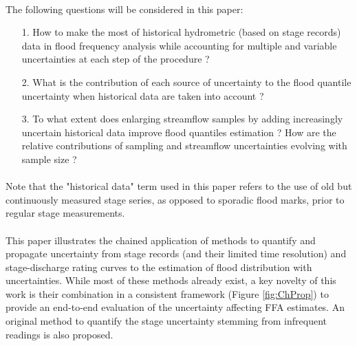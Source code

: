 \documentclass[11pt]{article}
\begin{document}
    \paragraph{}
    The following questions will be considered in this paper: 
    \begin{itemize}
        \item[1.] How to make the most of historical hydrometric (based on stage records) data in flood frequency analysis while accounting for multiple and variable uncertainties at each step of the procedure ? 
        
        \item[2.] What is the contribution of each source of uncertainty to the flood quantile uncertainty when historical data are taken into account ? 
        
        \item[3.] To what extent does enlarging streamflow samples by adding increasingly uncertain historical data improve flood quantiles estimation ? How are the relative contributions of sampling and streamflow uncertainties evolving with sample size ?
    \end{itemize}

    \paragraph{}
    Note that the "historical data" term used in this paper refers to the use of old but continuously measured stage series, as opposed to sporadic flood marks, prior to regular stage measurements. 

    \paragraph{}
    This paper illustrates the chained application of methods to quantify and propagate uncertainty from stage records (and their limited time resolution) and stage-discharge rating curves to the estimation of flood distribution with uncertainties. While most of these methods already exist, a key novelty of this work is their combination in a consistent framework (Figure \ref{fig:ChProp}) to provide an end-to-end evaluation of the  uncertainty affecting FFA estimates. An original method to quantify the stage uncertainty stemming from infrequent readings is also proposed.
\end{document}
